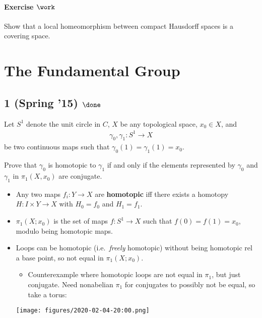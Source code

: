 \hypertarget{exercise-work-41}{%
\paragraph{\texorpdfstring{Exercise
\(\work\)}{Exercise \textbackslash work}}\label{exercise-work-41}}

Show that a local homeomorphism between compact Hausdorff spaces is a
covering space.

\hypertarget{the-fundamental-group}{%
\section{The Fundamental Group}\label{the-fundamental-group}}

\hypertarget{spring-15-done-2}{%
\subsection{\texorpdfstring{1 (Spring '15)
\(\done\)}{1 (Spring '15) \textbackslash done}}\label{spring-15-done-2}}

\begin{problem}[?]

Let \(S^1\) denote the unit circle in \(C\), \(X\) be any topological
space, \(x_0 \in X\), and
\begin{align*}\gamma_0, \gamma_1 : S^1 \to X\end{align*}
be two continuous maps such that \(\gamma_0 (1) = \gamma_1 (1) = x_0\).

Prove that \(\gamma_0\) is homotopic to \(\gamma_1\) if and only if the
elements represented by \(\gamma_0\) and \(\gamma_1\) in
\(\pi_1 (X, x_0 )\) are conjugate.

\end{problem}

\begin{concept}

\envlist

\begin{itemize}
\tightlist
\item
  Any two maps \(f_i: Y\to X\) are \textbf{homotopic} iff there exists a
  homotopy \(H: I\times Y \to X\) with \(H_0 = f_0\) and \(H_1 = f_1\).
\item
  \(\pi_1(X; x_0)\) is the set of maps \(f:S^1\to X\) such that
  \(f(0) = f(1) = x_0\), modulo being homotopic maps.
\item
  Loops can be homotopic (i.e.~\emph{freely} homotopic) without being
  homotopic rel a base point, so not equal in \(\pi_1(X; x_0)\).

  \begin{itemize}
  \tightlist
  \item
    Counterexample where homotopic loops are not equal in \(\pi_1\), but
    just conjugate. Need nonabelian \(\pi_1\) for conjugates to possibly
    not be equal, so take a torus:
  \end{itemize}

  \texttt{[image: figures/2020-02-04-20:00.png]}\\
\end{itemize}

\end{concept}

